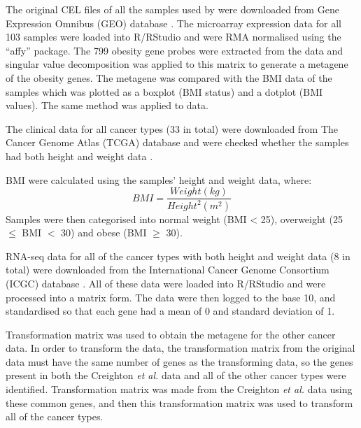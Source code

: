 \documentclass[12pt, a4paper]{article}
\begin{document}
\begin{description}[leftmargin=0pt]

\item[Validation of the methodology used.]

The original CEL files of all the samples used by \citet{Creighton2012}  were downloaded from Gene Expression Omnibus (GEO) database .
The microarray expression data for all 103 samples were loaded into R/RStudio and were RMA normalised using the  ``affy'' package.
The 799 obesity gene probes were extracted from the data and singular value decomposition was applied to this matrix to generate a metagene of the obesity genes.
The metagene was compared with the BMI data of the samples which was plotted as a boxplot (BMI status) and a dotplot (BMI values).
The same method was applied to \citet{Fuentes-Mattei2014} data.

\item[Identification of samples with BMI data.]

The clinical data for all cancer types (33 in total) were downloaded from The Cancer Genome Atlas (TCGA) database and were checked whether the samples had both height and weight data .

\item[BMI calculation and categorisation.]

    BMI were calculated using the samples' height and weight data, where:
    \begin{equation*}
    BMI = \frac{Weight(kg)}{Height^2(m^2)}
\end{equation*}
Samples were then categorised into normal weight (BMI \textless{ }25), overweight (25 $\le$ BMI $<$ 30) and obese (BMI $\ge$ 30).

\item[Processing the cancer data.]

RNA-seq data for all of the cancer types with both height and weight data (8 in total) were downloaded from the International Cancer Genome Consortium (ICGC) database .
All of these data were loaded into R/RStudio and were processed into a matrix form.
The data were then logged to the base 10, and standardised so that each gene had a mean of 0 and standard deviation of 1.

\item[Transforming the cancer data.]

Transformation matrix was used to obtain the metagene for the other cancer data.
In order to transform the data, the transformation matrix from the original data must have the same number of genes as the transforming data, so the genes present in both the Creighton \textit{et al.} data and all of the other cancer types were identified.
Transformation matrix was made from the Creighton \textit{et al.} data using these common genes, and then this transformation matrix was used to transform all of the cancer types.


\end{description}
\end{document}

